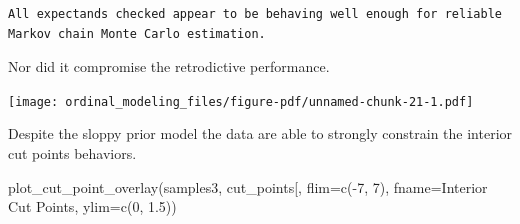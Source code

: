 \documentclass[
  letterpaper,
  DIV=11,
  numbers=noendperiod]{scrartcl}
\newenvironment{Shaded}{\begin{snugshade}}{\end{snugshade}}
\newcommand{\AttributeTok}[1]{\textcolor[rgb]{0.40,0.45,0.13}{#1}}
\newcommand{\ConstantTok}[1]{\textcolor[rgb]{0.56,0.35,0.01}{#1}}
\newcommand{\DecValTok}[1]{\textcolor[rgb]{0.68,0.00,0.00}{#1}}
\newcommand{\FloatTok}[1]{\textcolor[rgb]{0.68,0.00,0.00}{#1}}
\newcommand{\FunctionTok}[1]{\textcolor[rgb]{0.28,0.35,0.67}{#1}}
\newcommand{\NormalTok}[1]{\textcolor[rgb]{0.00,0.23,0.31}{#1}}
\newcommand{\OtherTok}[1]{\textcolor[rgb]{0.00,0.23,0.31}{#1}}
\newcommand{\SpecialCharTok}[1]{\textcolor[rgb]{0.37,0.37,0.37}{#1}}
\newcommand{\StringTok}[1]{\textcolor[rgb]{0.13,0.47,0.30}{#1}}
\begin{document}
\begin{Shaded}
\end{Shaded}

\begin{verbatim}
All expectands checked appear to be behaving well enough for reliable
Markov chain Monte Carlo estimation.
\end{verbatim}

Nor did it compromise the retrodictive performance.

\begin{Shaded}
\end{Shaded}

\texttt{[image: ordinal\_modeling\_files/figure-pdf/unnamed-chunk-21-1.pdf]}

Despite the sloppy prior model the data are able to strongly constrain
the interior cut points behaviors.

\begin{Shaded}
\begin{Highlighting}[]
\FunctionTok{plot\_cut\_point\_overlay}\NormalTok{(samples3, }\StringTok{\textquotesingle{}cut\_points[\textquotesingle{}}\NormalTok{,}
                       \AttributeTok{flim=}\FunctionTok{c}\NormalTok{(}\SpecialCharTok{{-}}\DecValTok{7}\NormalTok{, }\DecValTok{7}\NormalTok{), }\AttributeTok{fname=}\StringTok{\textquotesingle{}Interior Cut Points\textquotesingle{}}\NormalTok{,}
                       \AttributeTok{ylim=}\FunctionTok{c}\NormalTok{(}\DecValTok{0}\NormalTok{, }\FloatTok{1.5}\NormalTok{))}
\end{Highlighting}
\end{Shaded}
\end{document}
